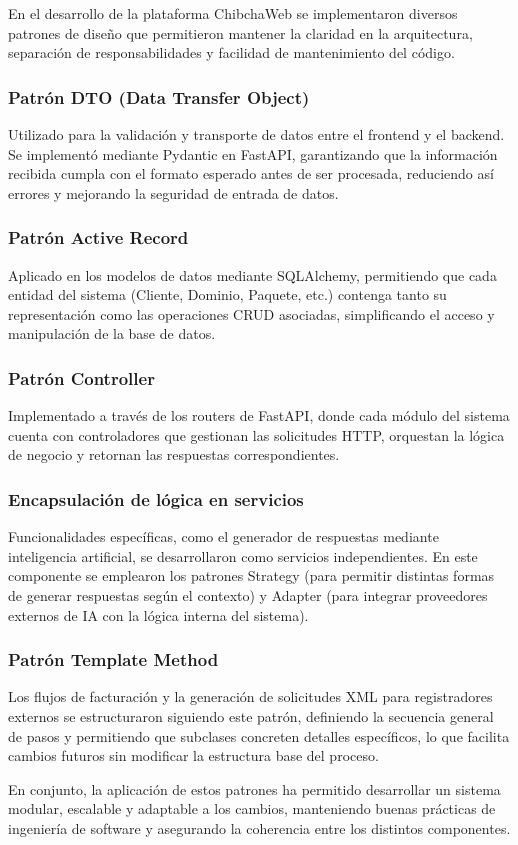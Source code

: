En el desarrollo de la plataforma ChibchaWeb se implementaron diversos patrones de diseño que permitieron mantener la claridad en la arquitectura, separación de responsabilidades y facilidad de mantenimiento del código.

\subsubsection{Patrón DTO (Data Transfer Object)}
Utilizado para la validación y transporte de datos entre el frontend y el backend. Se implementó mediante Pydantic en FastAPI, garantizando que la información recibida cumpla con el formato esperado antes de ser procesada, reduciendo así errores y mejorando la seguridad de entrada de datos.

\subsubsection{Patrón Active Record}
Aplicado en los modelos de datos mediante SQLAlchemy, permitiendo que cada entidad del sistema (Cliente, Dominio, Paquete, etc.) contenga tanto su representación como las operaciones CRUD asociadas, simplificando el acceso y manipulación de la base de datos.

\subsubsection{Patrón Controller}
Implementado a través de los routers de FastAPI, donde cada módulo del sistema cuenta con controladores que gestionan las solicitudes HTTP, orquestan la lógica de negocio y retornan las respuestas correspondientes.

\subsubsection{Encapsulación de lógica en servicios}
Funcionalidades específicas, como el generador de respuestas mediante inteligencia artificial, se desarrollaron como servicios independientes. En este componente se emplearon los patrones Strategy (para permitir distintas formas de generar respuestas según el contexto) y Adapter (para integrar proveedores externos de IA con la lógica interna del sistema).

\subsubsection{Patrón Template Method}
Los flujos de facturación y la generación de solicitudes XML para registradores externos se estructuraron siguiendo este patrón, definiendo la secuencia general de pasos y permitiendo que subclases concreten detalles específicos, lo que facilita cambios futuros sin modificar la estructura base del proceso.

En conjunto, la aplicación de estos patrones ha permitido desarrollar un sistema modular, escalable y adaptable a los cambios, manteniendo buenas prácticas de ingeniería de software y asegurando la coherencia entre los distintos componentes.
